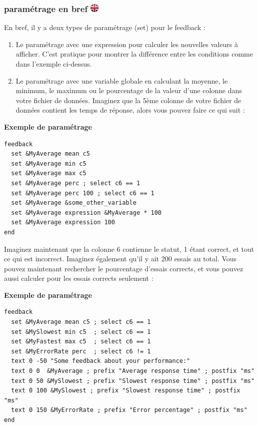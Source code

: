 \documentclass[
]{book}
\begin{document}
\hypertarget{paramuxe9trage-en-bref-ukflag}{%
\subsubsection[paramétrage en bref ]{\texorpdfstring{paramétrage en bref
\href{https://www.psytoolkit.org/doc3.1.0/feedback.html\#_set_in_summary}{\protect\includegraphics{img/ukflag.png}}}{paramétrage en bref ukflag}}\label{paramuxe9trage-en-bref-ukflag}}

En bref, il y a deux types de paramétrage (set) pour le feedback :

\begin{enumerate}
\def\labelenumi{\arabic{enumi})}
\item
  Le paramétrage avec une expression pour calculer les nouvelles valeurs
  à afficher. C'est pratique pour montrer la différence entre les
  conditions comme dans l'exemple ci-dessus.
\item
  Le paramétrage avec une variable globale en calculant la moyenne, le
  minimum, le maximum ou le pourcentage de la valeur d'une colonne dans
  votre fichier de données. Imaginez que la 5ème colonne de votre
  fichier de données contient les temps de réponse, alors vous pouvez
  faire ce qui suit :
\end{enumerate}

\textbf{Exemple de paramétrage}

\begin{verbatim}
feedback
  set &MyAverage mean c5
  set &MyAverage min c5
  set &MyAverage max c5
  set &MyAverage perc ; select c6 == 1
  set &MyAverage perc 100 ; select c6 == 1
  set &MyAverage &some_other_variable
  set &MyAverage expression &MyAverage * 100
  set &MyAverage expression 100
end
\end{verbatim}

Imaginez maintenant que la colonne 6 contienne le statut, 1 étant
correct, et tout ce qui est incorrect. Imaginez également qu'il y ait
200 essais au total. Vous pouvez maintenant rechercher le pourcentage
d'essais corrects, et vous pouvez aussi calculer pour les essais
corrects seulement :

\textbf{Exemple de paramétrage}

\begin{verbatim}
feedback
  set &MyAverage mean c5 ; select c6 == 1
  set &MySlowest min c5  ; select c6 == 1
  set &MyFastest max c5  ; select c6 == 1
  set &MyErrorRate perc  ; select c6 != 1
  text 0 -50 "Some feedback about your performance:"
  text 0 0  &MyAverage ; prefix "Average response time" ; postfix "ms"
  text 0 50 &MySlowest ; prefix "Slowest response time" ; postfix "ms"
  text 0 100 &MySlowest ; prefix "Slowest response time" ; postfix "ms"
  text 0 150 &MyErrorRate ; prefix "Error percentage" ; postfix "ms"
end
\end{verbatim}
\end{document}
